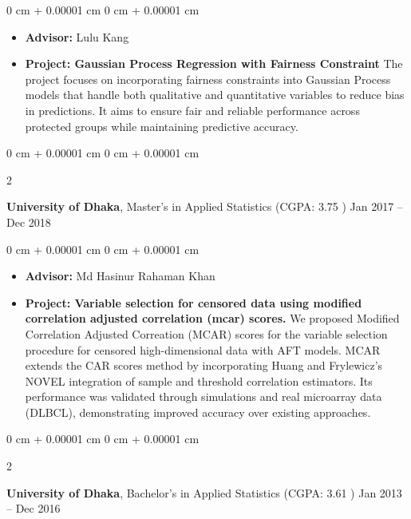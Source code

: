 \documentclass[10pt, letterpaper]{article}
\newenvironment{highlights}{
    \begin{itemize}[
        topsep=0.10 cm,
        parsep=0.10 cm,
        partopsep=0pt,
        itemsep=0pt,
        leftmargin=0 cm + 10pt
    ]
}{
    \end{itemize}
} %
\newenvironment{onecolentry}{
    \begin{adjustwidth}{
        0 cm + 0.00001 cm
    }{
        0 cm + 0.00001 cm
    }
}{
    \end{adjustwidth}
} %
\newenvironment{twocolentry}[2][]{
    \onecolentry
    \def\secondColumn{#2}
    \setcolumnwidth{\fill, 4.5 cm}
    \begin{paracol}{2}
}{
    \switchcolumn \raggedleft \secondColumn
    \end{paracol}
    \endonecolentry
} %
\begin{document}
        \vspace{0.10 cm}
        \begin{onecolentry}
            \begin{highlights}
                \item \textbf{Advisor:} Lulu Kang
                \item \textbf{Project: Gaussian Process Regression with Fairness Constraint} The project focuses on incorporating fairness constraints into Gaussian Process models that handle both qualitative and quantitative variables to reduce bias in predictions. It aims to ensure fair and reliable performance across protected groups while maintaining predictive accuracy.
            \end{highlights}
        \end{onecolentry}

    \vspace{0.20 cm}
    \begin{twocolentry}{
            Jan 2017 – Dec 2018
        }
            \textbf{University of Dhaka}, Master's in Applied Statistics (CGPA: 3.75 )\end{twocolentry}
        \vspace{0.10 cm}
        \begin{onecolentry}
            \begin{highlights}
                \item \textbf{Advisor:} Md Hasinur Rahaman Khan
                \item  \textbf{Project: Variable selection for censored data using modified correlation adjusted correlation (mcar) scores.} 
                We proposed Modified Correlation Adjusted Correation (MCAR) scores for the variable selection procedure for censored high-dimensional data with AFT models. MCAR extends the CAR scores method by incorporating Huang and Frylewicz’s NOVEL integration of sample and threshold correlation estimators. Its performance was validated through simulations and real microarray data (DLBCL), demonstrating improved accuracy over existing approaches.
            \end{highlights}
        \end{onecolentry}


    \begin{twocolentry}{
            Jan 2013 – Dec 2016
        }
            \textbf{University of Dhaka}, Bachelor's in Applied Statistics (CGPA: 3.61 )\end{twocolentry}
    
\end{document}

